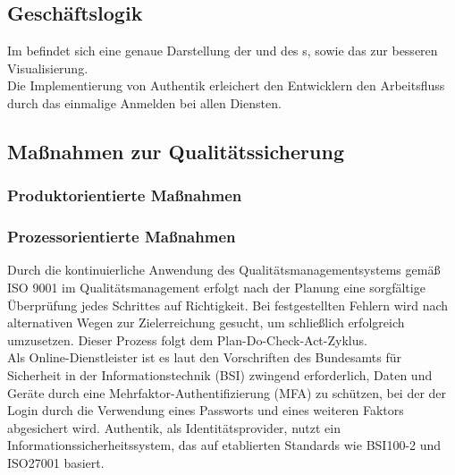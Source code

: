 \subsection{Geschäftslogik}
\label{sec:Geschaeftslogik}
Im  befindet sich eine genaue Darstellung der  und des s, 
sowie das  zur besseren Visualisierung. 
\\Die Implementierung von Authentik erleichert den Entwicklern den Arbeitsfluss durch das einmalige Anmelden bei allen Diensten.

\subsection{Maßnahmen zur Qualitätssicherung}
\label{sec:Qualitaetssicherung}

\subsubsection{Produktorientierte Maßnahmen}
\label{sec:ProduktorientierteMaßnahmen}

\subsubsection{Prozessorientierte Maßnahmen}
\label{sec:ProzessorientierteMaßnahmen}
Durch die kontinuierliche Anwendung des Qualitätsmanagementsystems gemäß ISO 9001 im Qualitätsmanagement erfolgt nach der Planung 
eine sorgfältige Überprüfung jedes Schrittes auf Richtigkeit. Bei festgestellten Fehlern wird nach alternativen Wegen zur 
Zielerreichung gesucht, um schließlich erfolgreich umzusetzen. Dieser Prozess folgt dem Plan-Do-Check-Act-Zyklus.
\\Als Online-Dienstleister ist es laut den Vorschriften des Bundesamts für Sicherheit in der Informationstechnik (BSI) 
zwingend erforderlich, Daten und Geräte durch eine Mehrfaktor-Authentifizierung (MFA) zu schützen, bei der der Login durch 
die Verwendung eines Passworts und eines weiteren Faktors abgesichert wird. Authentik, als Identitätsprovider, nutzt ein 
Informationssicherheitssystem, das auf etablierten Standards wie BSI100-2 und ISO27001 basiert.